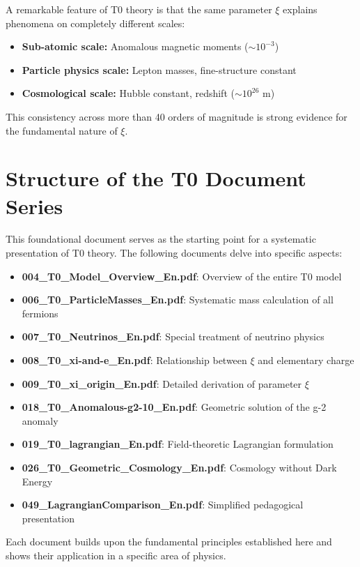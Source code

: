 	A remarkable feature of T0 theory is that the same parameter $\xi$ explains phenomena on completely different scales:
	
	\begin{itemize}
		\item \textbf{Sub-atomic scale:} Anomalous magnetic moments ($\sim 10^{-3}$)
		\item \textbf{Particle physics scale:} Lepton masses, fine-structure constant
		\item \textbf{Cosmological scale:} Hubble constant, redshift ($\sim 10^{26}$ m)
	\end{itemize}
	
	This consistency across more than 40 orders of magnitude is strong evidence for the fundamental nature of $\xi$.
	
	\section{Structure of the T0 Document Series}
	
	This foundational document serves as the starting point for a systematic presentation of T0 theory. The following documents delve into specific aspects:
	
	\begin{itemize}
		\item \textbf{004\_T0\_Model\_Overview\_En.pdf}: Overview of the entire T0 model
		\item \textbf{006\_T0\_ParticleMasses\_En.pdf}: Systematic mass calculation of all fermions
		\item \textbf{007\_T0\_Neutrinos\_En.pdf}: Special treatment of neutrino physics
		\item \textbf{008\_T0\_xi-and-e\_En.pdf}: Relationship between $\xi$ and elementary charge
		\item \textbf{009\_T0\_xi\_origin\_En.pdf}: Detailed derivation of parameter $\xi$
		\item \textbf{018\_T0\_Anomalous-g2-10\_En.pdf}: Geometric solution of the g-2 anomaly
		\item \textbf{019\_T0\_lagrangian\_En.pdf}: Field-theoretic Lagrangian formulation
		\item \textbf{026\_T0\_Geometric\_Cosmology\_En.pdf}: Cosmology without Dark Energy
		\item \textbf{049\_LagrangianComparison\_En.pdf}: Simplified pedagogical presentation
	\end{itemize}
	
	Each document builds upon the fundamental principles established here and shows their application in a specific area of physics.
	

